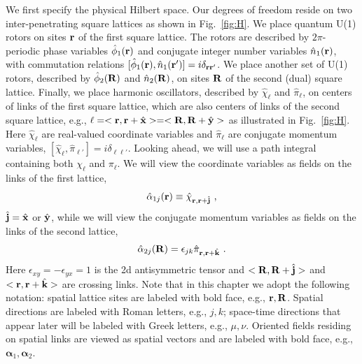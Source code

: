 We first specify the physical Hilbert space.  Our degrees of freedom reside on two inter-penetrating square lattices as shown in Fig.~\ref{fig:H}.  We place quantum U(1) rotors on sites ${\bf r}$ of the first square lattice.  The rotors are described by $2\pi$-periodic phase variables $\hat{\phi}_1({\bf r})$ and conjugate integer number variables $\hat{n}_1({\bf r})$, with commutation relations $[\hat{\phi}_1({\bf r}), \hat{n}_1({\bf r}')] = i \delta_{{\bf r}{\bf r}'}$.  We place another set of U(1) rotors, described by $\hat{\phi}_2({\bf R})$ and $\hat{n}_2({\bf R})$, on sites ${\bf R}$ of the second (dual) square lattice.  Finally, we place harmonic oscillators, described by $\hat{\chi}_\ell$ and $\hat{\pi}_\ell$, on centers of links of the first square lattice, which are also centers of links of the second square lattice, e.g., $\ell = <{\bf r}, {\bf r} + \hat{{\bf x}}> = <{\bf R}, {\bf R} + \hat{{\bf y}}>$ as illustrated in Fig.~\ref{fig:H}.  Here $\hat{\chi}_\ell$ are real-valued coordinate variables and $\hat{\pi}_\ell$ are conjugate momentum variables, $[\hat{\chi}_\ell, \hat{\pi}_{\ell'}] = i\delta_{\ell\ell'}$.  Looking ahead, we will use a path integral containing both $\chi_\ell$ and $\pi_\ell$.  We will view the coordinate variables as fields on the links of the first lattice,
\begin{equation}
\hat{\alpha}_{1j}({\bf r}) \equiv \hat{\chi}_{{\bf r}, {\bf r} + \hat{{\bf j}}} ~,
\end{equation}
$\hat{{\bf j}} = \hat{{\bf x}}$ or $\hat{{\bf y}}$, while we will view the conjugate momentum variables as fields on the links of the second lattice,
\begin{equation}
\hat{\alpha}_{2j}({\bf R}) = \epsilon_{jk} \hat{\pi}_{{\bf r}, {\bf r} + \hat{{\bf k}}} ~.
\end{equation}
Here $\epsilon_{xy} = -\epsilon_{yx} = 1$ is the 2d antisymmetric tensor and $<{\bf R}, {\bf R} + \hat{{\bf j}}>$ and $<{\bf r}, {\bf r} + \hat{{\bf k}}>$ are crossing links.\cite{footnoteKitaev}
Note that in this chapter we adopt the following notation:  spatial lattice sites are labeled with bold face, e.g., ${\bf r}, {\bf R}$.  Spatial directions are labeled with Roman letters, e.g., $j, k$; space-time directions that appear later will be labeled with Greek letters, e.g., $\mu, \nu$.  Oriented fields residing on spatial links are viewed as spatial vectors and are labeled with bold face, e.g., ${\bm \alpha_1}, {\bm \alpha_2}$.

